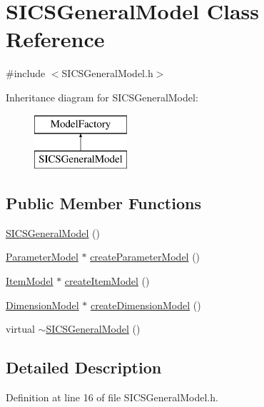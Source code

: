 \hypertarget{classSICSGeneralModel}{}\section{S\+I\+C\+S\+General\+Model Class Reference}
\label{classSICSGeneralModel}


{\ttfamily \#include $<$S\+I\+C\+S\+General\+Model.\+h$>$}

Inheritance diagram for S\+I\+C\+S\+General\+Model\+:\begin{figure}[H]
\begin{center}
\leavevmode
\includegraphics[height=2.000000cm]{classSICSGeneralModel}
\end{center}
\end{figure}
\subsection*{Public Member Functions}
\begin{DoxyCompactItemize}
\item 
\hyperlink{classSICSGeneralModel_a3d19adad0cd3cf346af4ab4486234f55}{S\+I\+C\+S\+General\+Model} ()
\item 
\hyperlink{classParameterModel}{Parameter\+Model} $\ast$ \hyperlink{classSICSGeneralModel_ac494be453a5c9213bfa1a959b1c985f1}{create\+Parameter\+Model} ()
\item 
\hyperlink{classItemModel}{Item\+Model} $\ast$ \hyperlink{classSICSGeneralModel_ae6d6f2faf2b10bc67114be9d742d354e}{create\+Item\+Model} ()
\item 
\hyperlink{classDimensionModel}{Dimension\+Model} $\ast$ \hyperlink{classSICSGeneralModel_a35ec6c2939eba08e663a7c0b99d796a2}{create\+Dimension\+Model} ()
\item 
virtual \hyperlink{classSICSGeneralModel_a3127ef946fd974f8efdea1e205999e0a}{$\sim$\+S\+I\+C\+S\+General\+Model} ()
\end{DoxyCompactItemize}


\subsection{Detailed Description}


Definition at line 16 of file S\+I\+C\+S\+General\+Model.\+h.



